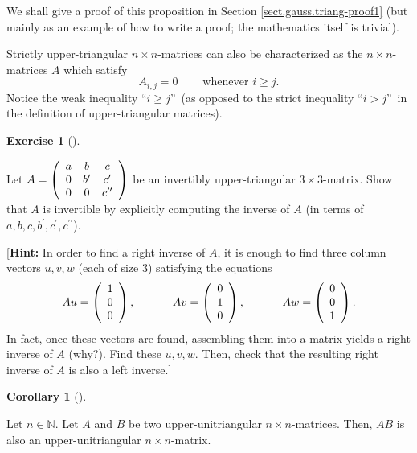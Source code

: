 \documentclass[numbers=enddot,12pt,final,onecolumn,notitlepage]{scrartcl}%
\theoremstyle{definition}
\newtheorem{coro}[theo]{Corollary}
\newenvironment{corollary}[1][]
{\begin{coro}[#1]\begin{leftbar}}
{\end{leftbar}\end{coro}}
\newtheorem{exmp}[theo]{Exercise}
\newenvironment{exercise}[1][]
{\begin{exmp}[#1]\begin{leftbar}}
{\end{leftbar}\end{exmp}}
\begin{document}
We shall give a proof of this proposition in Section
\ref{sect.gauss.triang-proof1} (but mainly as an example of how to write a
proof; the mathematics itself is trivial).

Strictly upper-triangular $n\times n$-matrices can also be characterized as
the $n\times n$-matrices $A$ which satisfy%
\[
A_{i,j}=0\ \ \ \ \ \ \ \ \ \ \text{whenever }i\geq j.
\]
Notice the weak inequality \textquotedblleft$i\geq j$\textquotedblright\ (as
opposed to the strict inequality \textquotedblleft$i>j$\textquotedblright\ in
the definition of upper-triangular matrices).

\begin{exercise}
\label{exe.inverses.3x3-ut}Let $A=\left(
\begin{array}
[c]{ccc}%
a & b & c\\
0 & b^{\prime} & c^{\prime}\\
0 & 0 & c^{\prime\prime}%
\end{array}
\right)  $ be an invertibly upper-triangular $3\times3$-matrix. Show that $A$
is invertible by explicitly computing the inverse of $A$ (in terms of
$a,b,c,b^{\prime},c^{\prime},c^{\prime\prime}$).

[\textbf{Hint:} In order to find a right inverse of $A$, it is enough to find
three column vectors $u,v,w$ (each of size $3$) satisfying the equations%
\[
Au=\left(
\begin{array}
[c]{c}%
1\\
0\\
0
\end{array}
\right)  ,\ \ \ \ \ \ \ \ \ \ Av=\left(
\begin{array}
[c]{c}%
0\\
1\\
0
\end{array}
\right)  ,\ \ \ \ \ \ \ \ \ \ Aw=\left(
\begin{array}
[c]{c}%
0\\
0\\
1
\end{array}
\right)  .
\]
In fact, once these vectors are found, assembling them into a matrix yields a
right inverse of $A$ (why?). Find these $u,v,w$. Then, check that the
resulting right inverse of $A$ is also a left inverse.]
\end{exercise}

\begin{corollary}
\label{cor.triangular.uni*uni}Let $n\in\mathbb{N}$. Let $A$ and $B$ be two
upper-unitriangular $n\times n$-matrices. Then, $AB$ is also an
upper-unitriangular $n\times n$-matrix.
\end{corollary}
\end{document}
